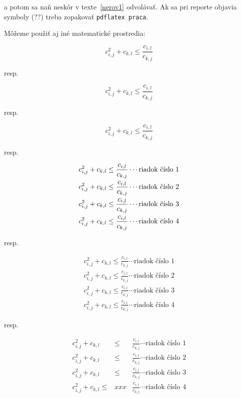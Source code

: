 a potom sa naň neskôr v texte~\eqref{nerov1} odvolávať. Ak sa pri reporte objavia symboly 
(??) treba zopakovať \verb|pdflatex praca|.


Môžeme použiť aj iné matematické prostredia:

$$
c_{i,j}^2+c_{k,l} \le \frac{c_{i,l}}{c_{k,j}}
$$

resp.

\begin{displaymath}
c_{i,j}^2+c_{k,l} \le \frac{c_{i,l}}{c_{k,j}}
\end{displaymath}

resp.

\begin{equation*} 
c_{i,j}^2+c_{k,l} \le \frac{c_{i,l}}{c_{k,j}}
\end{equation*}

resp.

\begin{multline*}
c_{i,j}^2+c_{k,l} \le \frac{c_{i,l}}{c_{k,j}} \cdots \mbox{riadok číslo 1} \allowdisplaybreaks\\
c_{i,j}^2+c_{k,l} \le \frac{c_{i,l}}{c_{k,j}} \cdots \mbox{riadok číslo 2} \allowdisplaybreaks\\
c_{i,j}^2+c_{k,l} \le \frac{c_{i,l}}{c_{k,j}} \cdots \mbox{riadok číslo 3} \allowdisplaybreaks\\
c_{i,j}^2+c_{k,l} \le \frac{c_{i,l}}{c_{k,j}} \cdots \mbox{riadok číslo 4}
\end{multline*}

resp.

\begin{multline}
c_{i,j}^2+c_{k,l} \le \frac{c_{i,l}}{c_{k,j}} \cdots \mbox{riadok číslo 1} \\
c_{i,j}^2+c_{k,l} \le \frac{c_{i,l}}{c_{k,j}} \cdots \mbox{riadok číslo 2} \\
c_{i,j}^2+c_{k,l} \le \frac{c_{i,l}}{c_{k,j}} \cdots \mbox{riadok číslo 3} \\
c_{i,j}^2+c_{k,l} \le \frac{c_{i,l}}{c_{k,j}} \cdots \mbox{riadok číslo 4}
\label{vztah-22}
\end{multline}

resp.

\begin{eqnarray*}
c_{i,j}^2+c_{k,l} &\le& \frac{c_{i,l}}{c_{k,j}} \cdots \mbox{riadok číslo 1} \\
c_{i,j}^2+c_{k,l} &\le& \frac{c_{i,l}}{c_{k,j}} \cdots \mbox{riadok číslo 2} \\
c_{i,j}^2+c_{k,l} &\le& \frac{c_{i,l}}{c_{k,j}} \cdots \mbox{riadok číslo 3} \\
c_{i,j}^2+c_{k,l} \le  &xxx& \frac{c_{i,l}}{c_{k,j}} \cdots \mbox{riadok číslo 4}
\end{eqnarray*}

